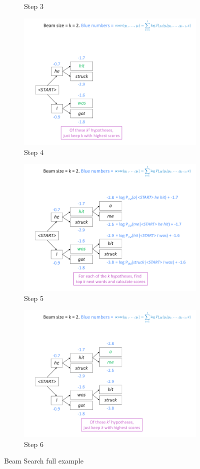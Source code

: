 \documentclass[11pt]{article}
\begin{document}
\begin{figure}[htb]
\begin{subfigure}[h]{0.45\linewidth}
		\caption{Step 3}
	\end{subfigure}
	\hspace{1em}
	\begin{subfigure}[h]{0.45\linewidth}
		\includegraphics[width=0.8\linewidth]{img/beam_search04}
		\caption{Step 4}
	\end{subfigure}
	\begin{subfigure}[h]{0.45\linewidth}
		\includegraphics[width=0.8\linewidth]{img/beam_search05}
		\caption{Step 5}
	\end{subfigure}
	\hspace{1em}
	\begin{subfigure}[h]{0.45\linewidth}
		\includegraphics[width=0.8\linewidth]{img/beam_search06}
		\caption{Step 6}
	\end{subfigure}
	\caption{Beam Search full example}
\end{figure}
\end{document}
